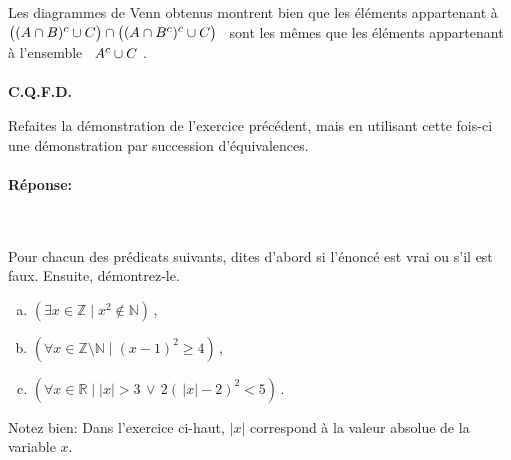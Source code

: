 \documentclass[12pt]{article}
\newcommand{\blanc}[1]{\textcolor{white}{#1}}
\newcommand{\ou}{\vee}                   %
\newcommand{\nondans}{\notin}              %
\newcommand{\inter}{\cap}                 %
\newcommand{\union}{\cup}                 %
\newcommand{\comp}{{\mbox{\footnotesize $c$}}} %
\newcommand{\ensembleU}{{\mathbf{U}}}  %
\newcommand{\ensembleN}{{\mathbb{N}}}  %
\newcommand{\ensembleZ}{{\mathbb{Z}}}  %
\newcommand{\ensembleR}{\mathbb{R}}    %
\newcommand{\cqfd}{\blanc{.}\\[-2mm]\mbox{}\hfill {\bf C.Q.F.D.}\\} %
\newcounter{exercice}\newcommand{\exercice}{\bigskip \addtocounter{exercice}{1}\noindent \textbf{Exercice \theexercice}\\}
\begin{document}
\begin{center}
\begin{minipage}{.2\textwidth}
\end{minipage}%
\end{center}

\noindent Les diagrammes de Venn obtenus montrent bien que les éléments appartenant à \guillemotleft ~$\big((A \inter B)^\comp \union C\big) \inter \big((A\inter B^\comp)^\comp \union C\big)$ \guillemotright ~sont les mêmes que les éléments appartenant à l'ensemble \guillemotleft ~$A^\comp \union C$ \guillemotright .\\
\cqfd






\newpage

\exercice 
Refaites la démonstration de l'exercice précédent, mais en utilisant cette fois-ci une démonstration par succession d'équivalences.


\paragraph{Réponse:}~\\






\newpage

\exercice 
Pour chacun des prédicats suivants, dites d'abord si l'énoncé est vrai ou s'il est faux. Ensuite, démontrez-le.

\begin{enumerate}[a)]
\item \quad
$(\exists x\in \ensembleZ \mid x^2 \nondans \ensembleN  )\,, $
\item \quad
$(\forall x\in \ensembleZ\setminus \ensembleN\mid (x-1)^2\geq4  )\,, $
\item \quad
$(\forall x\in \ensembleR\mid |x|>3 \,\ou\, 2(\,|x|-2 )^2<5)\,.$
\end{enumerate}
Notez bien: Dans l'exercice ci-haut, $|x|$ correspond à la valeur absolue de la variable $x$.
\end{document}
